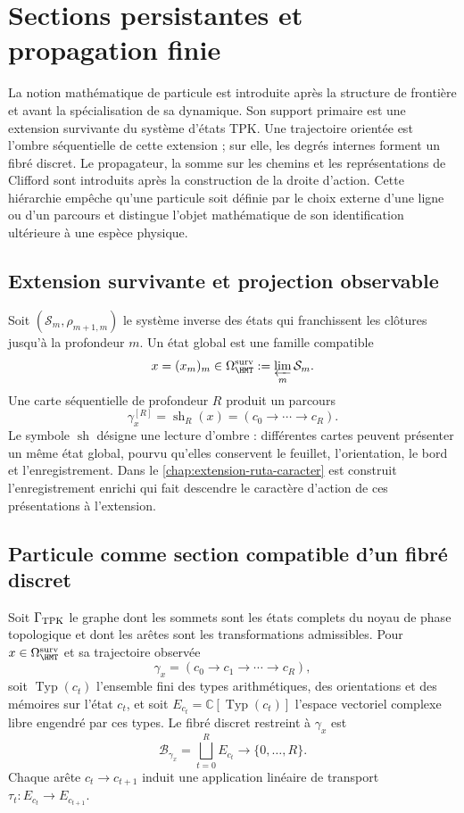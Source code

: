 \chapter{Sections persistantes et propagation finie}
\label{chap:particula}

La notion mathématique de particule est introduite après la structure de frontière et avant la spécialisation de sa dynamique. Son support primaire est une extension survivante du système d’états TPK\@. Une trajectoire orientée est l’ombre séquentielle de cette extension ; sur elle, les degrés internes forment un fibré discret. Le propagateur, la somme sur les chemins et les représentations de Clifford sont introduits après la construction de la droite d’action. Cette hiérarchie empêche qu’une particule soit définie par le choix externe d’une ligne ou d’un parcours et distingue l’objet mathématique de son identification ultérieure à une espèce physique.

\section{Extension survivante et projection observable}

Soit \((\mathcal S_m,\rho_{m+1,m})\) le système inverse des états qui franchissent les clôtures jusqu’à la profondeur \(m\). Un état global est une famille compatible
\[
 x=(x_m)_m\in\Omega_{\HMT}^{\rm surv}
 :=\varprojlim_m\mathcal S_m.
\]
Une carte séquentielle de profondeur \(R\) produit un parcours
\[
 \gamma_x^{[R]}=\operatorname{sh}_R(x)
 =(c_0\longrightarrow\cdots\longrightarrow c_R).
\]
Le symbole \(\operatorname{sh}\) désigne une lecture d’ombre : différentes cartes peuvent présenter un même état global, pourvu qu’elles conservent le feuillet, l’orientation, le bord et l’enregistrement. Dans le \cref{chap:extension-ruta-caracter} est construit l’enregistrement enrichi qui fait descendre le caractère d’action de ces présentations à l’extension.

\section{Particule comme section compatible d’un fibré discret}

Soit \(\Gamma_{\rm TPK}\) le graphe dont les sommets sont les états complets du noyau de phase topologique et dont les arêtes sont les transformations admissibles. Pour \(x\in\Omega_{\HMT}^{\rm surv}\) et sa trajectoire observée
\[
 \gamma_x=(c_0\longrightarrow c_1\longrightarrow\cdots
 \longrightarrow c_R),
\]
soit \(\operatorname{Typ}(c_t)\) l’ensemble fini des types arithmétiques, des orientations et des mémoires sur l’état \(c_t\), et soit \(E_{c_t}=\mathbb C[\operatorname{Typ}(c_t)]\) l’espace vectoriel complexe libre engendré par ces types. Le fibré discret restreint à \(\gamma_x\) est
\[
 \mathcal B_{\gamma_x}=\bigsqcup_{t=0}^{R}E_{c_t}
 \longrightarrow\{0,\ldots,R\}.
\]
Chaque arête \(c_t\to c_{t+1}\) induit une application linéaire de transport \(\tau_t:E_{c_t}\to E_{c_{t+1}}\).

